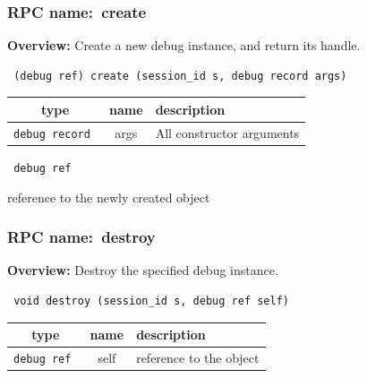 \subsubsection{RPC name:~create}

{\bf Overview:} 
Create a new debug instance, and return its handle.

\begin{verbatim} (debug ref) create (session_id s, debug record args)\end{verbatim}



 
\vspace{0.3cm}
\begin{tabular}{|c|c|p{7cm}|}
 \hline
{\bf type} & {\bf name} & {\bf description} \\ \hline
{\tt debug record } & args & All constructor arguments \\ \hline 

\end{tabular}

\vspace{0.3cm}

{\tt 
debug ref
}


reference to the newly created object
\vspace{0.3cm}
\vspace{0.3cm}
\vspace{0.3cm}
\subsubsection{RPC name:~destroy}

{\bf Overview:} 
Destroy the specified debug instance.

\begin{verbatim} void destroy (session_id s, debug ref self)\end{verbatim}



 
\vspace{0.3cm}
\begin{tabular}{|c|c|p{7cm}|}
 \hline
{\bf type} & {\bf name} & {\bf description} \\ \hline
{\tt debug ref } & self & reference to the object \\ \hline 

\end{tabular}

\vspace{0.3cm}

